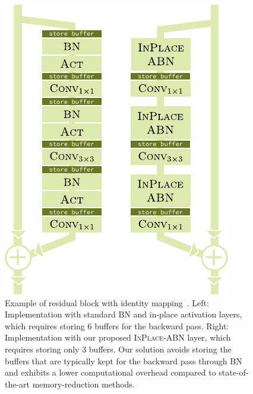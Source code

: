 \documentclass[10pt,twocolumn,letterpaper]{article}
\newcommand{\bnInplace}{\textsc{InPlace-ABN}\xspace}
\begin{document}
\begin{figure}[t]
 \centering
 \includegraphics{teaser-v2.pdf}
 \caption{Example of residual block with identity mapping~\cite{He+16}. Left: Implementation with standard \textsc{BN} and in-place activation layers, which requires storing $6$ buffers for the backward pass. Right: Implementation with our proposed \bnInplace layer, which requires storing only $3$ buffers. Our solution avoids storing the buffers that are typically kept for the backward pass through \textsc{BN} and exhibits a lower computational overhead compared to state-of-the-art memory-reduction methods.}
 \label{fig:teaser}
 \vspace{-12pt}
\end{figure}
 
\end{document}
